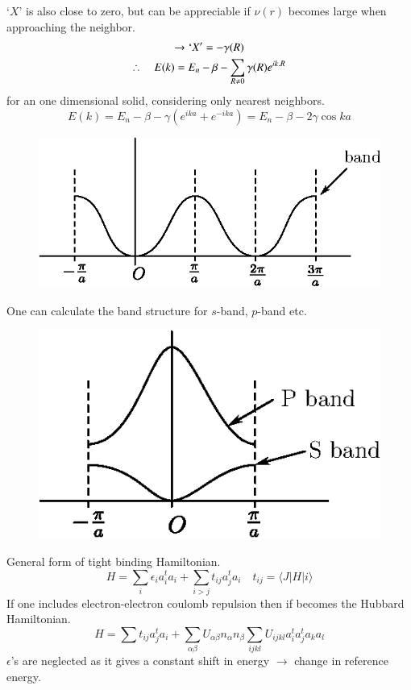 `$X$' is also close to zero, but can be appreciable if $\nu(r)$ becomes large when approaching the neighbor.
\begin{gather*}
\to `X' = -\gamma(R)\\
\therefore\quad E(k)=E_{n}-\beta-\sum\limits_{R\neq 0}\gamma(R)e^{ik.R}
\end{gather*}
for an one dimensional solid, considering only nearest neighbors.
$$
E(k)=E_{n}-\beta-\gamma(e^{ika}+e^{-ika})=E_{n}-\beta-2\gamma \cos ka
$$
\begin{figure}[H]
\centering
\includegraphics[scale=.8]{images/lecture25/fig7.eps}
\end{figure}
One can calculate the band structure for $s$-band, $p$-band etc.
\begin{figure}[H]
\centering
\includegraphics[scale=.8]{images/lecture25/fig8.eps}
\end{figure}
General form of tight binding Hamiltonian.
$$
H=\sum\limits_{i}\epsilon_{i}a_{i}^{t}a_{i}+\sum\limits_{i>j}t_{ij}a_{j}^{t}a_{i}\quad t_{ij}=\langle J |H|i\rangle
$$
If one includes electron-electron coulomb repulsion then if becomes the Hubbard Hamiltonian.
$$
H=\sum t_{ij}a^{t}_{j}a_{i}+\sum_{\alpha\beta}U_{\alpha\beta}n_{\alpha}n_{\beta}\sum_{ijkl}U_{ijkl}a_{i}^{t}a^{t}_{j}a_{k}a_{l}
$$
$\epsilon$'s are neglected as it gives a constant shift in energy $\to$ change in reference energy.

